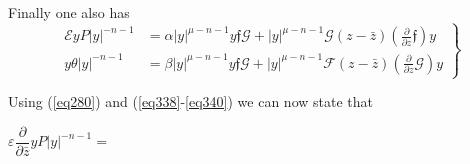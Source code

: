 Finally one also has 
\begin{equation*}
\left.
\begin{aligned}
\mathcal {E} y P | y |^{-n-1} &= \alpha |y|^{\mu - n -1} y \mathfrak{f}
\mathcal{G} + |y| ^{\mu - n - 1 } \mathcal{G} (z - \bar{z})
(\frac{\partial}{\partial z } \mathfrak{f}) y \\ 
y \theta | y |^{-n-1} &= \beta |y|^{\mu - n -1} y \mathfrak{f}
\mathcal{G} + |y| ^{\mu - n - 1 } \mathcal{F} (z - \bar{z})
(\frac{\partial}{\partial z } \mathcal{G}) y  
\end{aligned}
\right \} \tag{340}\label{eq340}  
\end{equation*}

Using (\ref{eq280}) and (\ref{eq338}-\ref{eq340}) we can now state that 

$\varepsilon \dfrac{\partial}{\partial \bar{z}}y P|y|^{-n-1} =$
